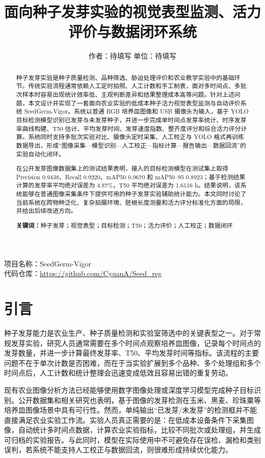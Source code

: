 \documentclass[UTF8,a4paper,zihao=-4]{ctexart}
\title{\textbf{面向种子发芽实验的视觉表型监测、活力评价与数据闭环系统}}
\author{作者：待填写 \quad 单位：待填写}
\date{}
\begin{document}
\maketitle

\begin{center}
项目名称：SeedGerm-Vigor \\
代码仓库：\url{https://github.com/CyuanA/Seed_reg}
\end{center}

\begin{abstract}
种子发芽实验是种子质量检测、品种筛选、胁迫处理评价和农业教学实验中的基础环节。传统实验流程通常依赖人工定时拍照、人工计数和手工制表，面对多时间点、多批次样本时容易出现统计效率低、主观判断差异和结果整理成本高等问题。针对上述问题，本文设计并实现了一套面向农业实验的低成本种子活力视觉表型监测与自动评价系统 SeedGerm-Vigor。系统以普通 RGB 培养皿图像和 USB 摄像头为输入，基于 YOLO 目标检测模型识别已发芽与未发芽种子，并进一步完成单时间点发芽率统计、时序发芽率曲线构建、T50 估计、平均发芽时间、发芽速度指数、整齐度评分和综合活力评分计算。系统同时支持多批次实验对比、摄像头定时采集、人工校正与 YOLO 格式再训练数据导出，形成“图像采集—模型识别—人工校正—指标计算—报告输出—数据回流”的实验自动化闭环。

在公开发芽图像数据集上的测试结果表明，接入的目标检测模型在测试集上取得 Precision 0.9438、Recall 0.9220、mAP50 0.9670 和 mAP50--95 0.8923；基于检测结果计算的发芽率平均绝对误差为 4.87\%，T50 平均绝对误差为 1.6116 h。结果说明，该系统能够在普通图像采集条件下提供可用的种子发芽实验辅助统计能力。本文同时讨论了当前系统在跨物种泛化、复杂拍摄环境、胚根长度测量和活力评分标准化方面的局限，并给出后续改进方向。

\noindent\textbf{关键词：}种子发芽；视觉表型；目标检测；T50；活力评价；人工校正；数据闭环
\end{abstract}

\section{引言}

种子发芽能力是农业生产、种子质量检测和实验室筛选中的关键表型之一。对于常规发芽实验，研究人员通常需要在多个时间点观察培养皿图像，记录每个时间点的发芽数量，并进一步计算最终发芽率、T50、平均发芽时间等指标。该流程的主要问题不在于单次计数是否困难，而在于当实验扩展到多个品种、多个处理组和多个时间点后，人工计数和统计整理会迅速变成低效且容易出错的重复劳动。

现有农业图像分析方法已经能够使用数字图像处理或深度学习模型完成种子目标识别。公开数据集和相关研究也表明，基于图像的发芽检测在玉米、黑麦、珍珠粟等培养皿图像场景中具有可行性\cite{mendeley_dataset,genze2020}。然而，单纯输出“已发芽/未发芽”的检测框并不能直接满足农业实验工作流。实验人员真正需要的是：在低成本设备条件下采集图像，自动统计多时间点数据，计算农业实验指标，比较不同批次或处理组，并生成可归档的实验报告。与此同时，模型在实际使用中不可避免存在误检、漏检和类别误判，若系统不能支持人工校正与数据回流，则很难形成持续优化能力。
\end{document}
